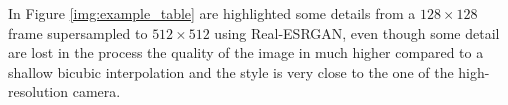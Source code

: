 In Figure \ref{img:example_table} are highlighted some details from a \(128\times128\) frame supersampled to \(512\times512\) using Real-ESRGAN, even though some detail are lost in the process the quality of the image in much higher compared to a shallow bicubic interpolation and the style is very close to the one of the high-resolution camera.
